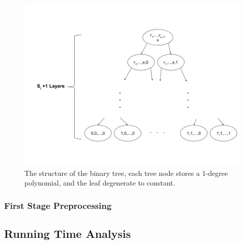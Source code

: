 \begin{figure}
\label{fig::bin_structure}
\includegraphics[width=15cm]{structurebintree.png}
\caption{The structure of the binary tree, each tree node stores a $1$-degree polynomial, and the leaf degenerate to constant.}
\end{figure}

\subsubsection{First Stage Preprocessing}

\subsection{Running Time Analysis}